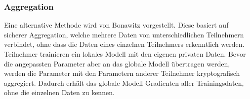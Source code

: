 \subsubsection*{Aggregation}
Eine alternative Methode wird von Bonawitz \etal \cite{P-36} vorgestellt.
Diese basiert auf sicherer Aggregation, welche mehrere Daten von unterschiedlichen Teilnehmern verbindet, ohne dass die Daten eines einzelnen Teilnehmers erkenntlich werden.
Teilnehmer trainieren ein lokales Modell mit den eigenen privaten Daten. 
Bevor die angepassten Parameter aber an das globale Modell übertragen werden, werden die Parameter mit den Parametern anderer Teilnehmer kryptografisch aggregiert.
Dadurch erhält das globale Modell Gradienten aller Trainingsdaten, ohne die einzelnen Daten zu kennen.

